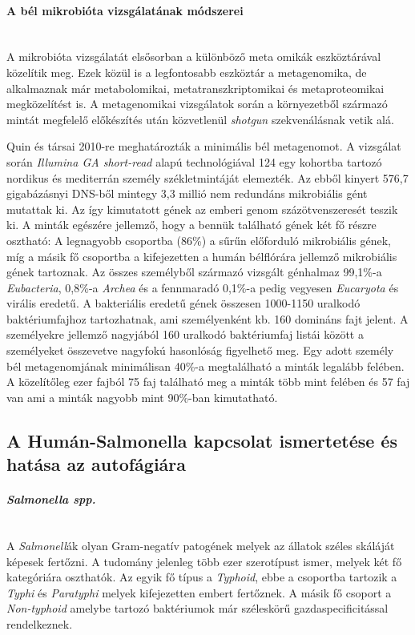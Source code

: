 \documentclass[a4paper,12pt]{article}
\begin{document}
		\paragraph{A bél mikrobióta vizsgálatának módszerei} \mbox{}\\
		A mikrobióta vizsgálatát elsősorban a különböző meta omikák eszköztárával közelítik meg. Ezek közül is a legfontosabb eszköztár a metagenomika, de alkalmaznak már metabolomikai, metatranszkriptomikai és metaproteomikai megközelítést is. A metagenomikai vizsgálatok során a környezetből származó mintát megfelelő előkészítés után közvetlenül \textit{shotgun} szekvenálásnak vetik alá.\cite{gut_microbiome} 
		
		Quin és társai 2010-re meghatározták a minimális bél metagenomot. A vizsgálat során \textit{Illumina GA short-read} alapú technológiával 124 egy kohortba tartozó nordikus és mediterrán személy székletmintáját elemezték. Az ebből kinyert 576,7 gigabázásnyi DNS-ből mintegy 3,3 millió nem redundáns mikrobiális gént mutattak ki. Az így kimutatott gének az emberi genom százötvenszeresét teszik ki. A minták egészére jellemző, hogy a bennük található gének két fő részre osztható: A legnagyobb csoportba (86\%) a sűrűn előforduló mikrobiális gének, míg a másik fő csoportba a kifejezetten a humán bélflórára jellemző mikrobiális gének tartoznak. Az összes személyből származó vizsgált génhalmaz 99,1\%-a \textit{Eubacteria}, 0,8\%-a \textit{Archea} és a fennmaradó 0,1\%-a pedig vegyesen \textit{Eucaryota} és virális eredetű. A bakteriális eredetű gének összesen 1000-1150 uralkodó baktériumfajhoz tartozhatnak, ami személyenként kb. 160 domináns fajt jelent. A személyekre jellemző nagyjából 160 uralkodó baktériumfaj listái között a személyeket összevetve nagyfokú hasonlóság figyelhető meg. Egy adott személy bél metagenomjának minimálisan 40\%-a megtalálható a minták legalább felében. A közelítőleg ezer fajból 75 faj található meg a minták több mint felében és 57 faj van ami a minták nagyobb mint 90\%-ban kimutatható.  \cite{meta_omics}
		
	
	\subsection{A Humán-Salmonella kapcsolat ismertetése és hatása az autofágiára}
	
		\paragraph{\textit{Salmonella spp.}} \mbox{}\\
		A \textit{Salmonell}ák olyan Gram-negatív patogének melyek az állatok széles skáláját képesek fertőzni. A tudomány jelenleg több ezer szerotípust ismer, melyek két fő kategóriára oszthatók. Az egyik fő típus a \textit{Typhoid}, ebbe a csoportba tartozik a \textit{Typhi} és \textit{Paratyphi} melyek kifejezetten embert fertőznek. A másik fő csoport a \textit{Non-typhoid} amelybe tartozó baktériumok már széleskörű gazdaspecificitással rendelkeznek. \cite{salmonella_and_host_cell_nature}
		
\end{document}

